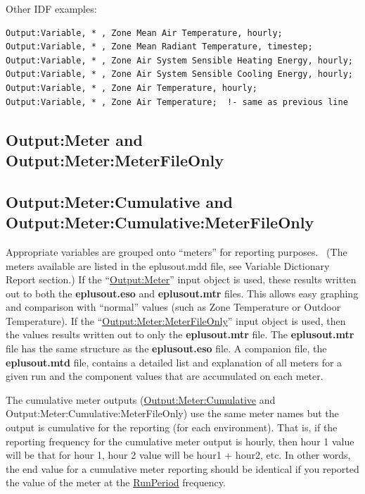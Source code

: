 Other IDF examples:

\begin{lstlisting}
Output:Variable, * , Zone Mean Air Temperature, hourly;
Output:Variable, * , Zone Mean Radiant Temperature, timestep;
Output:Variable, * , Zone Air System Sensible Heating Energy, hourly;
Output:Variable, * , Zone Air System Sensible Cooling Energy, hourly;
Output:Variable, * , Zone Air Temperature, hourly;
Output:Variable, * , Zone Air Temperature;  !- same as previous line
\end{lstlisting}


\subsection{Output:\-Meter and Output:\-Meter:\-Meter\-File\-Only}\label{outputmeter-and-outputmetermeterfileonly}

\subsection{Output:\-Meter:\-Cumulative and Output:\-Meter:\-Cumulative:\-Meter\-File\-Only}\label{outputmetercumulative-and-outputmetercumulativemeterfileonly}

Appropriate variables are grouped onto ``meters'' for reporting purposes.~ (The meters available are listed in the eplusout.mdd file, see Variable Dictionary Report section.) If the ``\hyperref[outputmeter-and-outputmetermeterfileonly]{Output:Meter}'' input object is used, these results written out to both the \textbf{eplusout.eso} and \textbf{eplusout.mtr} files. This allows easy graphing and comparison with ``normal'' values (such as Zone Temperature or Outdoor Temperature). If the ``\hyperref[outputmeter-and-outputmetermeterfileonly]{Output:Meter:MeterFileOnly}'' input object is used, then the values results written out to only the \textbf{eplusout.mtr} file. The \textbf{eplusout.mtr} file has the same structure as the \textbf{eplusout.eso} file. A companion file, the \textbf{eplusout.mtd} file, contains a detailed list and explanation of all meters for a given run and the component values that are accumulated on each meter.

The cumulative meter outputs (\hyperref[outputmetercumulative-and-outputmetercumulativemeterfileonly]{Output:Meter:Cumulative} and Output:\-Meter:\-Cumulative:\-Meter\-File\-Only) use the same meter names but the output is cumulative for the reporting (for each environment). That is, if the reporting frequency for the cumulative meter output is hourly, then hour 1 value will be that for hour 1, hour 2 value will be hour1 + hour2, etc. In other words, the end value for a cumulative meter reporting should be identical if you reported the value of the meter at the \hyperref[runperiod]{RunPeriod} frequency.


